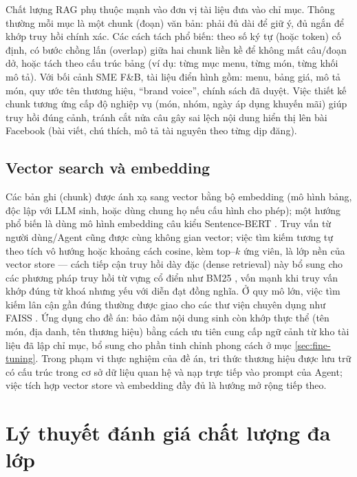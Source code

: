 Chất lượng RAG phụ thuộc mạnh vào đơn vị tài liệu đưa vào
chỉ mục. Thông thường mỗi mục là một chunk (đoạn) văn
bản: phải đủ dài để giữ ý, đủ ngắn để khớp truy hồi chính
xác. Các cách tách phổ biến: theo số ký tự (hoặc token) cố
định, có bước chồng lấn (overlap) giữa hai chunk liền
kề để không mất câu/đoạn dở, hoặc tách theo cấu trúc bảng
(ví dụ: từng mục menu, từng món, từng khối mô tả).
Với bối cảnh SME F\&B, tài liệu điển hình gồm: menu, bảng
giá, mô tả món, quy ước tên thương hiệu, ``brand voice'',
chính sách đã duyệt. Việc thiết kế chunk tương ứng cấp độ
nghiệp vụ (món, nhóm, ngày áp dụng khuyến mãi) giúp truy
hồi đúng cảnh, tránh cắt nửa câu gây sai lệch nội dung
hiển thị lên bài Facebook (bài viết, chú thích,
mô tả tài nguyên theo từng dịp đăng).

\subsection{Vector search và embedding}

Các bản ghi (chunk) được ánh xạ sang vector bằng bộ
embedding (mô hình bảng, độc lập với LLM sinh, hoặc
dùng chung họ nếu cấu hình cho phép); một hướng phổ
biến là dùng mô hình embedding câu kiểu Sentence-BERT
. Truy vấn từ
người dùng/Agent cũng được cùng không gian vector; việc
tìm kiếm tương tự theo tích vô hướng hoặc khoảng cách
cosine, kèm top--$k$ ứng viên, là lớp nền
của vector store --- cách tiếp cận truy hồi dày đặc
(dense retrieval)  này bổ
sung cho các phương pháp truy hồi từ vựng cổ điển như
BM25 , vốn mạnh khi truy vấn
khớp đúng từ khoá nhưng yếu với diễn đạt đồng nghĩa.
Ở quy mô lớn, việc tìm kiếm lân cận gần đúng thường
được giao cho các thư viện chuyên dụng như FAISS
. Ứng dụng cho đề án: bảo đảm nội
dung sinh còn khớp thực thể (tên món, địa
danh, tên thương hiệu) bằng cách ưu tiên cung cấp ngữ
cảnh từ kho tài liệu đã lập chỉ mục, bổ sung cho phần
tinh chỉnh phong cách ở mục
\ref{sec:fine-tuning}. Trong phạm vi thực nghiệm của đề án,
tri thức thương hiệu được lưu trữ có cấu trúc trong cơ sở dữ liệu
quan hệ và nạp trực tiếp vào prompt của Agent; việc tích hợp
vector store và embedding đầy đủ là hướng mở rộng tiếp theo.

\section{Lý thuyết đánh giá chất lượng đa lớp}\label{sec:eval-metrics}

